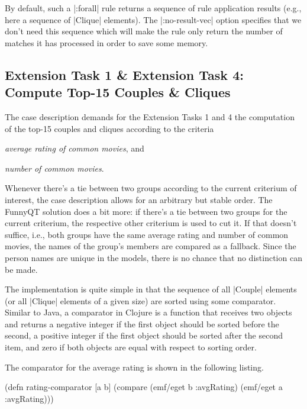 \documentclass[a4paper]{article}
\newcommand{\code}{\clojureinline}
\begin{document}
By default, such a \code|:forall| rule returns a sequence of rule application
results (e.g., here a sequence of \code|Clique| elements).  The
\code|:no-result-vec| option specifies that we don't need this sequence which
will make the rule only return the number of matches it has processed in order
to save some memory.


\subsection{Extension Task 1 \& Extension Task 4: Compute Top-15 Couples \&
  Cliques}
\label{sec:ext-task-1:top-15}

The case description demands for the Extension Tasks 1 and 4 the computation of
the top-15 couples and cliques according to the criteria
\begin{compactenum}[(a)]
\item \emph{average rating of common movies}, and
\item \emph{number of common movies}.
\end{compactenum}

Whenever there's a tie between two groups according to the current criterium of
interest, the case description allows for an arbitrary but stable order.  The
FunnyQT solution does a bit more: if there's a tie between two groups for the
current criterium, the respective other criterium is used to cut it.  If that
doesn't suffice, i.e., both groups have the same average rating and number of
common movies, the names of the group's members are compared as a fallback.
Since the person names are unique in the models, there is no chance that no
distinction can be made.

The implementation is quite simple in that the sequence of all \code|Couple|
elements (or all \code|Clique| elements of a given size) are sorted using some
comparator.  Similar to Java, a comparator in Clojure is a function that
receives two objects and returns a negative integer if the first object should
be sorted before the second, a positive integer if the first object should be
sorted after the second item, and zero if both objects are equal with respect
to sorting order.

The comparator for the average rating is shown in the following listing.

\begin{clojurecode}
(defn rating-comparator [a b]
  (compare (emf/eget b :avgRating) (emf/eget a :avgRating)))
\end{clojurecode}
\end{document}
